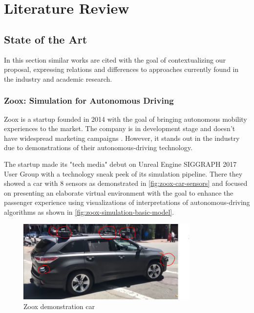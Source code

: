 

\chapter{Literature Review}\label{literature_review}

\section{State of the Art}

    In this section similar works are cited with the goal of contextualizing our proposal, expressing relations and differences to approaches currently found in the industry and academic research. 

\subsection{Zoox: Simulation for Autonomous Driving}

    Zoox is a startup founded in 2014 with the goal of bringing autonomous mobility experiences to the market. The company is in development stage \cite{zoox-linkedin} and doesn't have widespread marketing campaigns \cite{zoox-official-website}. However, it stands out in the industry due to demonstrations of their autonomous-driving technology. 
    
    The startup made its "tech media" debut on Unreal Engine SIGGRAPH 2017 User Group \cite{zoox-unreal-siggraph-2017} with a technology sneak peek of its simulation pipeline. There they showed a car with 8 sensors as demonstrated in \autoref{fig:zoox-car-sensors} and focused on presenting an elaborate virtual environment with the goal to enhance the passenger experience using visualizations of interpretations of autonomous-driving algorithms as shown in \autoref{fig:zoox-simulation-basic-model}.
    
    \begin{figure}[H]
     \caption{\label{fig:zoox-car-sensors}
Zoox demonstration car}
     \begin{center}
        \includegraphics[width=0.8\textwidth]{images/zoox-car_red-lines.PNG}
     \end{center}
    \end{figure}
    
